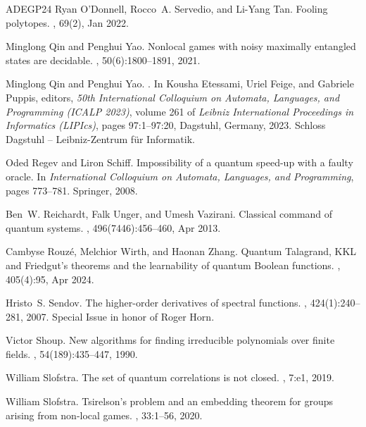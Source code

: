\documentclass[10pt,a4paper]{article}
\theoremstyle{plain}
\theoremstyle{definition}
\newcommand{\1}{\mathbb{1}} %
\begin{document}
\begin{thebibliography}{ADEGP24}
Ryan O’Donnell, Rocco~A. Servedio, and Li-Yang Tan.
\newblock Fooling polytopes.
, 69(2), Jan 2022.

Minglong Qin and Penghui Yao.
\newblock Nonlocal games with noisy maximally entangled states are decidable.
, 50(6):1800--1891, 2021.

Minglong Qin and Penghui Yao.
.
\newblock In Kousha Etessami, Uriel Feige, and Gabriele Puppis, editors, {\em
  50th International Colloquium on Automata, Languages, and Programming (ICALP
  2023)}, volume 261 of {\em Leibniz International Proceedings in Informatics
  (LIPIcs)}, pages 97:1--97:20, Dagstuhl, Germany, 2023. Schloss Dagstuhl --
  Leibniz-Zentrum f{\"u}r Informatik.

Oded Regev and Liron Schiff.
\newblock Impossibility of a quantum speed-up with a faulty oracle.
\newblock In {\em International Colloquium on Automata, Languages, and
  Programming}, pages 773--781. Springer, 2008.

Ben~W. Reichardt, Falk Unger, and Umesh Vazirani.
\newblock Classical command of quantum systems.
, 496(7446):456--460, Apr 2013.

Cambyse Rouz{\'e}, Melchior Wirth, and Haonan Zhang.
\newblock Quantum {T}alagrand, {KKL} and {F}riedgut's theorems and the
  learnability of quantum {B}oolean functions.
, 405(4):95, Apr 2024.

Hristo~S. Sendov.
\newblock The higher-order derivatives of spectral functions.
, 424(1):240--281, 2007.
\newblock Special Issue in honor of Roger Horn.

Victor Shoup.
\newblock New algorithms for finding irreducible polynomials over finite
  fields.
, 54(189):435--447, 1990.

William Slofstra.
\newblock The set of quantum correlations is not closed.
, 7:e1, 2019.

William Slofstra.
\newblock Tsirelson’s problem and an embedding theorem for groups arising
  from non-local games.
, 33:1--56, 2020.


\end{thebibliography}
\end{document}
